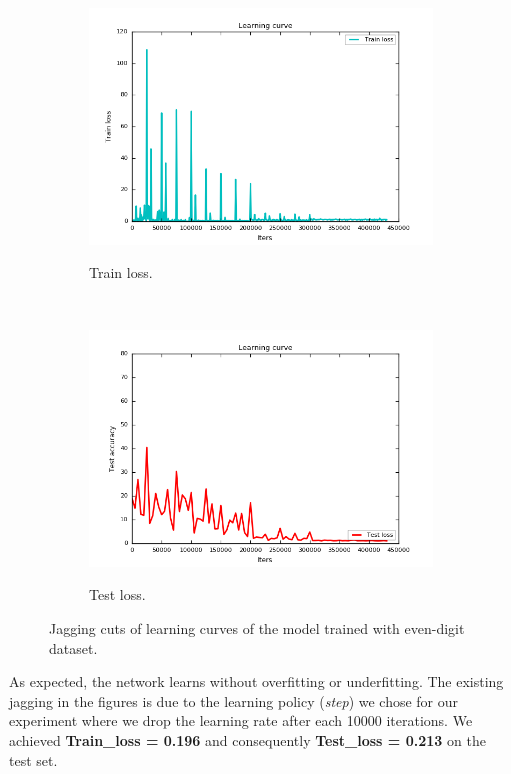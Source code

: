 \begin{figure}[h!]
    \centering
    \begin{subfigure}[t]{0.5\textwidth}
        \centering
        {\includegraphics[width=1\textwidth]{images/ltc_train_real}}
        \caption{Train loss.}
    \end{subfigure}%
    ~ 
    \begin{subfigure}[t]{0.5\textwidth}
        \centering
        {\includegraphics[width=1\textwidth]{images/ltc_test_real}}
        \caption{Test loss.}
    \end{subfigure}
    \caption{Jagging cuts of learning curves of the model trained with even-digit dataset.}
    \label{fig:curve}
\end{figure}

As expected, the network learns without overfitting or underfitting. The existing jagging in the figures is due to the learning policy (\textit{step}) we chose for our experiment where we drop the learning rate after each 10000 iterations. We achieved \textbf{Train\_loss = 0.196} and consequently \textbf{Test\_loss = 0.213} on the test set.

